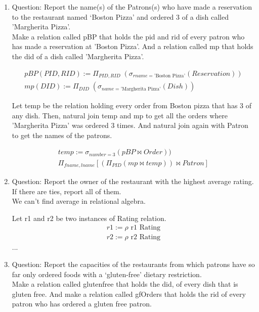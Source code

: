 \documentclass{article}
\begin{document}
\begin{enumerate}
    \item %
         Question: Report the name(s) of the Patrons(s) who have made a reservation to the restaurant
named ‘Boston Pizza’ and ordered 3 of a dish called ’Margherita Pizza’.\\

Make a relation called pBP that holds the pid and rid of every patron who has made a reservation at 'Boston Pizza'. 
And a relation called mp that holds the did of a dish called ’Margherita Pizza’.

\begin{align}
       pBP(PID,RID) := \Pi_{PID, RID}\;(\sigma_{rname = \text{'Boston Pizza'}}(Reservation))\\
        mp(DID) := \Pi_{DID}\;(\sigma_{name = \text{’Margherita Pizza’}}(Dish))
		\end{align} 
		
		Let temp be the relation holding every order from Boston pizza that has 3 of any dish. Then, natural join temp and mp to get all the orders where ’Margherita Pizza’ was ordered 3 times. And natural join again with Patron to  get the names of the patrons. 
		
\begin{align}
       temp := \sigma_{number = 3}(pBP \bowtie Order))\\
       \Pi_{fname, lname}[(\Pi_{PID} (mp \bowtie temp)) \bowtie Patron]
		\end{align} 

\item %
Question: Report the owner of the restaurant with the highest average rating. If there are ties, report all of them.\\

We can't find average in relational algebra.

Let r1 and r2 be two instances of Rating relation.
         \begin{align}
        r1:= \rho \text{  r1 Rating}  \\
        r2:= \rho \text{  r2 Rating}
		\end{align}     
		...

\item %
Question: Report the capacities of the restaurants from which patrons have so far only ordered foods with a
‘gluten-free’ dietary restriction.\\	

Make a relation called glutenfree that holds the did, of every dish that is gluten free. And make a relation called gfOrders that holds the rid of every patron who has ordered a gluten free patron.
		

\end{enumerate}
\end{document}
